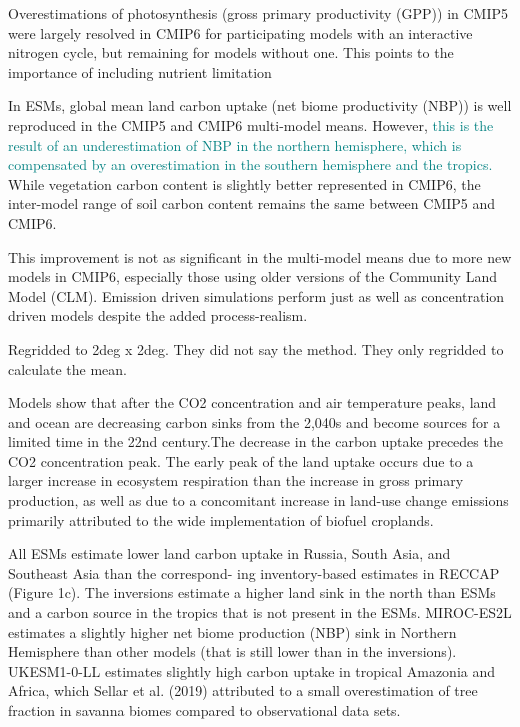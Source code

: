 \documentclass{article}
\begin{document}
Overestimations of photosynthesis (gross primary productivity (GPP)) in CMIP5 were largely resolved in CMIP6 for participating models with an interactive nitrogen cycle, but remaining for models without one. This points to the importance of including nutrient limitation

In ESMs, global mean land carbon uptake (net biome productivity (NBP)) is well reproduced in the CMIP5 and CMIP6 multi-model means. However, \textcolor{teal}{this is the result of an underestimation of NBP in the northern hemisphere, which is compensated by an overestimation in the southern hemisphere and the tropics.} While vegetation carbon content is slightly better represented in CMIP6, the inter-model range of soil carbon content remains the same between CMIP5 and CMIP6.

This improvement is not as significant in the multi-model means due to more new models in CMIP6, especially those using older versions of the Community Land Model (CLM). Emission driven simulations perform just as well as concentration driven models despite the added process-realism.

Regridded to 2deg x 2deg. They did not say the method. They only regridded to calculate the mean. 

\citet{Melnikova2021}

Models show that after the CO2 concentration and air temperature peaks, land and ocean are decreasing carbon sinks from the 2,040s and become sources for a limited time in the 22nd century.The decrease in the carbon uptake
precedes the CO2 concentration peak. The early peak of the land uptake occurs due to a larger increase in ecosystem respiration than the increase in gross primary production, as well as due to a concomitant increase in land-use change emissions primarily attributed to the wide implementation of biofuel croplands.

All ESMs estimate lower land carbon uptake in Russia, South Asia, and Southeast Asia than the correspond- ing inventory-based estimates in RECCAP (Figure 1c). The inversions estimate a higher land sink in the north than ESMs and a carbon source in the tropics that is not present in the ESMs. MIROC-ES2L estimates a slightly higher net biome production (NBP) sink in Northern Hemisphere than other models (that is still lower than in the inversions). UKESM1-0-LL estimates slightly high carbon uptake in tropical Amazonia and Africa, which Sellar et al. (2019) attributed to a small overestimation of tree fraction in savanna biomes compared to observational data sets.
\end{document}
